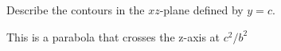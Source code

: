 Describe the contours in the $xz$-plane defined by $y = c$.

\begin{solution}
    This is a parabola that crosses the z-axis at $c^2/b^2$
\end{solution}